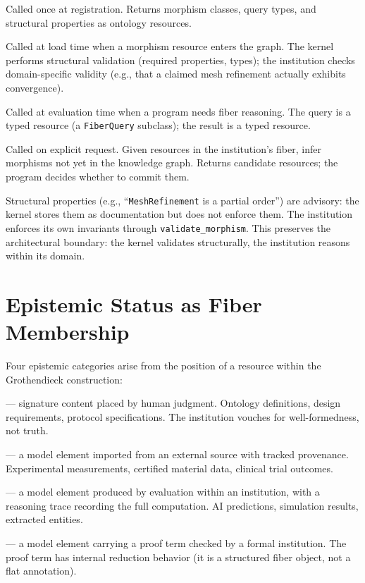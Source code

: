 \documentclass[10pt,twocolumn,letterpaper]{article}
\newcommand{\code}[1]{\texttt{\small #1}}
\begin{document}
\begin{description}[style=unboxed,leftmargin=0em]
\item[\code{fiber\_declaration}] Called once at registration. Returns morphism classes, query types, and structural properties as ontology resources.
\item[\code{validate\_morphism}] Called at load time when a morphism resource enters the graph. The kernel performs structural validation (required properties, types); the institution checks domain-specific validity (e.g., that a claimed mesh refinement actually exhibits convergence).
\item[\code{query}] Called at evaluation time when a program needs fiber reasoning. The query is a typed resource (a \code{FiberQuery} subclass); the result is a typed resource.
\item[\code{discover\_morphisms}] Called on explicit request. Given resources in the institution's fiber, infer morphisms not yet in the knowledge graph. Returns candidate resources; the program decides whether to commit them.
\end{description}

Structural properties (e.g., ``\code{MeshRefinement} is a partial order'') are advisory: the kernel stores them as documentation but does not enforce them.
The institution enforces its own invariants through \code{validate\_morphism}.
This preserves the architectural boundary: the kernel validates structurally, the institution reasons within its domain.


\section{Epistemic Status as Fiber Membership}
\label{sec:epistemic}

Four epistemic categories arise from the position of a resource within the Grothendieck construction:

\begin{description}[style=unboxed,leftmargin=0em]
\item[Declared] --- signature content placed by human judgment. Ontology definitions, design requirements, protocol specifications. The institution vouches for well-formedness, not truth.
\item[Observed] --- a model element imported from an external source with tracked provenance. Experimental measurements, certified material data, clinical trial outcomes.
\item[Derived] --- a model element produced by evaluation within an institution, with a reasoning trace recording the full computation. AI predictions, simulation results, extracted entities.
\item[Verified] --- a model element carrying a proof term checked by a formal institution. The proof term has internal reduction behavior (it is a structured fiber object, not a flat annotation).
\end{description}
\end{document}
